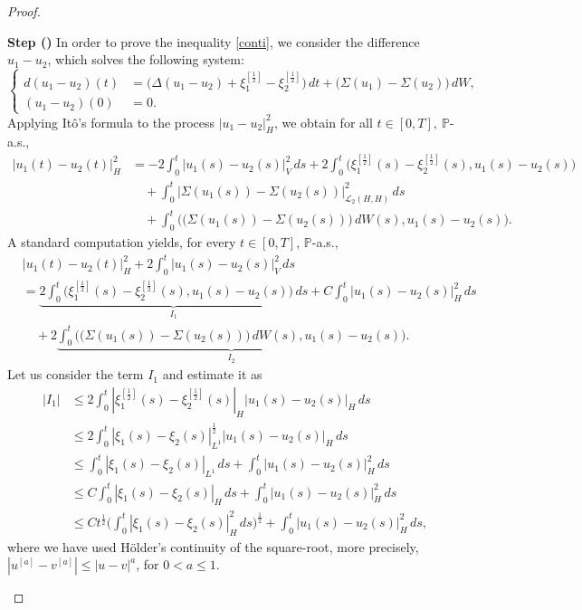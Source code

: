 \documentclass[english,a4paper,11pt]{amsart}
\theoremstyle{plain}
\theoremstyle{definition}
\theoremstyle{remark}
\numberwithin{equation}{section}
\newcounter{lil1}
\newenvironment{step}
{\begin{list} { \bf Step (\Roman{lil1})}
		{ \usecounter{lil1}
			\setlength{\leftmargin}{0.0cm}
			\setlength{\topsep}{0.2cm}
			\setlength{\itemsep}{0.0cm}
			\setlength{\parsep}{0.1cm}
			\setlength{\itemindent}{0.8cm}
			\setlength{\parskip}{0.0cm}}}
	{\end{list}}
\newcounter{lil33}
\newcounter{lil1q}
\renewcommand{\P}{\mathbb{P}}
\begin{document}
\begin{proof}
\begin{step}
In order to prove the inequality \eqref{conti}, we consider the difference $u_1-u_2$, which solves the following system:
%
\begin{equation*}
	\left\{
	\begin{aligned}
		d ( u_1-u_2)(t)&= \big(\Delta (u_1-u_2)+\xi_1^{[\frac{1}{2}]}-\xi_2^{[\frac{1}{2}]}\big)\, d t+\big(\Sigma (u_1)-\Sigma(u_2)\big)\, dW, \\
		(u_1-u_2)(0)&=0.
	\end{aligned}
	\right.
\end{equation*}Applying It\^o's formula to the process $ | u_1-u_2 | _H^2$, we obtain  for all $t\in[0,T], \ \P$-a.s.,
\begin{align*}
	 | u_1(t)-u_2(t) | _H^2&=   -2\int_0^t  | u_1(s)-u_2(s) | _V^2\,ds+2 \int_0^t \big(\xi_1^{[\frac{1}{2}]}(s)-\xi_2^{[\frac{1}{2}]}(s), u_1(s)-u_2(s)\big)
	\\&\quad +\int_0^t  | \Sigma (u_1(s))-\Sigma(u_2(s)) | _{\mathcal{L}_2(H,H)}^2\,ds
	\\&
	\quad + \int_0^t \Big(\big(\Sigma (u_1(s))-\Sigma(u_2(s))\big)\, dW(s), u_1(s)-u_2(s)\Big).
\end{align*} 
A standard computation yields, for every $t \in [0,T]$, $\mathbb{P}$-a.s.,
\begin{align*}
	& | u_1(t)-u_2(t) | _H^2  +2\int_0^t  | u_1(s)-u_2(s) | _V^2\,ds
	\\&
	= \underbrace{2 \int_0^t \big(\xi_1^{[\frac{1}{2}]}(s)-\xi_2^{[\frac{1}{2}]}(s), u_1(s)-u_2(s)\big)\,ds}_{I_1}
	+C \int_0^t  | u_1(s)-u_2(s) | _{H}^2\,ds
	\\&
	\quad +2 \underbrace{\int_0^t \Big(\big(\Sigma (u_1(s))-\Sigma(u_2(s))\big)\, dW(s), u_1(s)-u_2(s)\Big) }_{I_2}.
\end{align*}Let us consider the term $I_1$ and estimate it as 
\begin{align*}
	|I_1| &\leq 2 \int_0^t  | \xi_1^{[\frac{1}{2}]}(s)-\xi_2^{[\frac{1}{2}]}(s) | _{H} |  u_1(s)-u_2(s) | _H\,ds
	\\& \leq 2 \int_0^t  | \xi_1(s)-\xi_2(s) | _{L^1}^{\frac{1}{2}} |  u_1(s)-u_2(s) | _H\,ds
	\\&\leq 
	\int_0^t  | \xi_1(s)-\xi_2(s) | _{L^1}\,ds + \int_0^t |  u_1(s)-u_2(s) | _H^2\,ds
	\\&\leq 
	C \int_0^t  | \xi_1(s)-\xi_2(s) | _{H}\,ds + \int_0^t |  u_1(s)-u_2(s) | _H^2\,ds
	\\&\leq 
	C t^{\frac{1}{2}}\bigg(\int_0^t  | \xi_1(s)-\xi_2(s) | _{H}^2\,ds\bigg)^{\frac{1}{2}}+ \int_0^t |  u_1(s)-u_2(s) | _H^2\,ds,
\end{align*}where we have used  H\"older's continuity of the square-root, more precisely, $|u^{[a]}-v^{[a]}|\leq |u-v|^a$, for $0<a\leq 1$. 


\end{step}
\end{proof}
\end{document}
